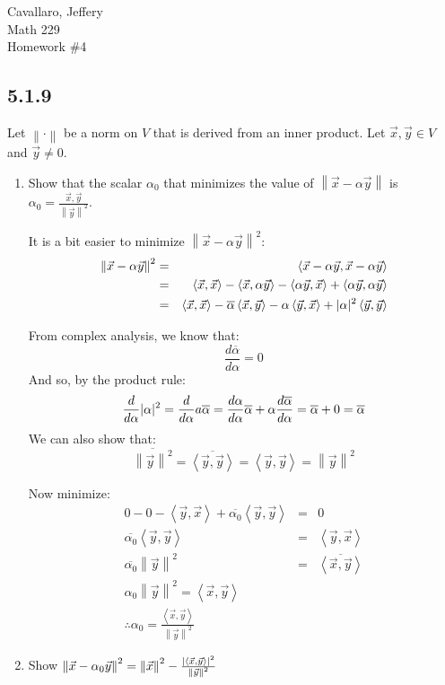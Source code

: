 \documentclass[letterpaper,12pt,fleqn]{article}
\newcommand{\inner}[2]{\left<#1,#2\right>}
\newcommand{\norm}[1]{\left\lVert#1\right\rVert}
\newcommand{\vx}{\vec{x}}
\newcommand{\vy}{\vec{y}}
\renewcommand{\a}{\alpha}
\newcommand{\conj}[1]{\overline{#1}}
\newcommand{\nc}{\norm{\cdot}}
\begin{document}
Cavallaro, Jeffery \\
Math 229 \\
Homework \#4

\bigskip

\subsection*{5.1.9}
Let $\nc$ be a norm on $V$ that is derived from an inner product. Let
$\vx,\vy\in V$ and $\vy\ne0$.
\begin{enumerate}[label={\alph*)}]
\item Show that the scalar $\a_0$ that minimizes the value of
  $\norm{\vx-\a\vy}$ is $\a_0=\frac{\vx,\vy}{\norm{\vy}^2}$.

  It is a bit easier to minimize $\norm{\vx-\a\vy}^2$:
  \begin{eqnarray*}
    \norm{\vx-\a\vy}^2 &=& \inner{\vx-\a\vy}{\vx-\a\vy} \\
    &=& \inner{\vx}{\vx}-\inner{\vx}{\a\vy}-\inner{\a\vy}{\vx}+
    \inner{\a\vy}{\a\vy} \\
    &=& \inner{\vx}{\vx}-\conj{\a}\inner{\vx}{\vy}-\a\inner{\vy}{\vx}+
    \abs{\a}^2\inner{\vy}{\vy}
  \end{eqnarray*}

  From complex analysis, we know that:
  \[\frac{d\conj{\a}}{d\a}=0\]
  And so, by the product rule:
  \[\frac{d}{d\a}\abs{\a}^2=\frac{d}{d\a}a\conj{\a}=
  \frac{d\a}{d\a}\conj{\a}+\a\frac{d\conj{\a}}{d\a}=\conj{\a}+0=\conj{\a}\]
  We can also show that:
  \[\conj{\norm{\vy}^2}=\conj{\inner{\vy}{\vy}}=\inner{\vy}{\vy}=
  \norm{\vy}^2\]

  Now minimize:
  \begin{eqnarray*}
    0-0-\inner{\vy}{\vx}+\conj{\a_0}\inner{\vy}{\vy} &=& 0 \\
    \conj{\a_0}\inner{\vy}{\vy} &=& \inner{\vy}{\vx} \\
    \conj{\a_0}\norm{\vy}^2 &=& \conj{\inner{\vx}{\vy}} \\
    \a_0\norm{\vy}^2=\inner{\vx}{\vy} \\
    \therefore\a_0=\frac{\inner{\vx}{\vy}}{\norm{\vy}^2}
  \end{eqnarray*}

\item Show $\norm{\vx-\a_0\vy}^2=\norm{\vx}^2-
  \frac{\abs{\inner{\vx}{\vy}}^2}{\norm{\vy}^2}$


\end{enumerate}
\end{document}
